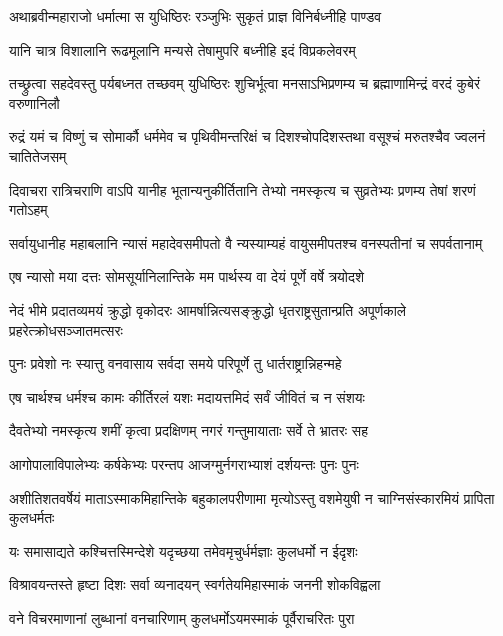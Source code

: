 \twolineshloka
{अथाब्रवीन्महाराजो धर्मात्मा स युधिष्ठिरः}
{रञ्जुभिः सुकृतं प्राज्ञ विनिर्बध्नीहि पाण्डव}


\twolineshloka
{यानि चात्र विशालानि रूढमूलानि मन्यसे}
{तेषामुपरि बध्नीहि इदं विप्रकलेवरम्}



\onelineshloka
{तच्छ्रुत्वा सहदेवस्तु पर्यबध्नत तच्छवम्}
\twolineshloka
{युधिष्ठिरः शुचिर्भूत्वा मनसाऽभिप्रणम्य च}
{ब्रह्माणामिन्द्रं वरदं कुबेरं वरुणानिलौ}


\threelineshloka
{रुद्रं यमं च विष्णुं च सोमार्कौ धर्ममेव च}
{पृथिवीमन्तरिक्षं च दिशश्चोपदिशस्तथा}
{वसूश्चं मरुतश्चैव ज्वलनं चातितेजसम्}


\fourlineindentedshloka
{दिवाचरा रात्रिचराणि वाऽपि}
{यानीह भूतान्यनुकीर्तितानि}
{तेभ्यो नमस्कृत्य च सुव्रतेभ्यः}
{प्रणम्य तेषां शरणं गतोऽहम्}


\fourlineindentedshloka
{सर्वायुधानीह महाबलानि}
{न्यासं महादेवसमीपतो वै}
{न्यस्याम्यहं वायुसमीपतश्च}
{वनस्पतीनां च सपर्वतानाम्}


\twolineshloka
{एष न्यासो मया दत्तः सोमसूर्यानिलान्तिके}
{मम पार्थस्य वा देयं पूर्णे वर्षे त्रयोदशे}


\threelineshloka
{नेदं भीमे प्रदातव्यमयं क्रुद्धो वृकोदरः}
{आमर्षान्नित्यसङ्क्रुद्धो धृतराष्ट्रसुतान्प्रति}
{अपूर्णकाले प्रहरेत्क्रोधसञ्जातमत्सरः}


\twolineshloka
{पुनः प्रवेशो नः स्यात्तु वनवासाय सर्वदा}
{समये परिपूर्णे तु धार्तराष्ट्रान्निहन्महे}


\twolineshloka
{एष चार्थश्च धर्मश्च कामः कीर्तिरलं यशः}
{मदायत्तमिदं सर्वं जीवितं च न संशयः}



\twolineshloka
{दैवतेभ्यो नमस्कृत्य शमीं कृत्वा प्रदक्षिणम्}
{नगरं गन्तुमायाताः सर्वे ते भ्रातरः सह}


\twolineshloka
{आगोपालाविपालेभ्यः कर्षकेभ्यः परन्तप}
{आजग्मुर्नगराभ्याशं दर्शयन्तः पुनः पुनः}


\threelineshloka
{अशीतिशतवर्षेयं माताऽस्माकमिहान्तिके}
{बहुकालपरीणामा मृत्योऽस्तु वशमेयुषी}
{न चाग्निसंस्कारमियं प्रापिता कुलधर्मतः}


\twolineshloka
{यः समासाद्यते कश्चित्तस्मिन्देशे यदृच्छया}
{तमेवमृचुर्धर्मज्ञाः कुलधर्मो न ईदृशः}


\twolineshloka
{विश्रावयन्तस्ते हृष्टा दिशः सर्वा व्यनादयन्}
{स्वर्गतेयमिहास्माकं जननी शोकविह्वला}


\twolineshloka
{वने विचरमाणानां लुब्धानां वनचारिणाम्}
{कुलधर्मोऽयमस्माकं पूर्वैराचरितः पुरा}


